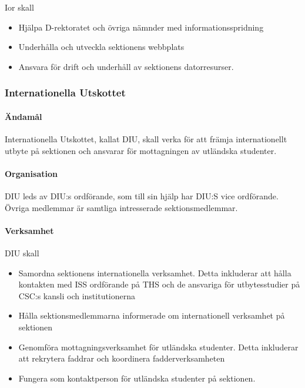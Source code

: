 \documentclass[a4paper,12pt]{article}
\begin{document}
Ior skall

\begin{itemize}
  \item Hjälpa D-rektoratet och övriga nämnder med informationsspridning
  \item Underhålla och utveckla sektionens webbplats
  \item Ansvara för drift och underhåll av sektionens datorresurser.
\end{itemize}

\subsubsection{Internationella Utskottet}

\paragraph{Ändamål}

Internationella Utskottet, kallat DIU, skall verka för att främja internationellt utbyte på sektionen och ansvarar för mottagningen av utländska studenter.

\paragraph{Organisation}

DIU leds av DIU:s ordförande, som till sin hjälp har DIU:S vice ordförande. Övriga medlemmar är samtliga intresserade sektionsmedlemmar.

\paragraph{Verksamhet}

DIU skall

\begin{itemize}
  \item Samordna sektionens internationella verksamhet. Detta inkluderar att hålla kontakten med ISS ordförande på THS och de ansvariga för utbytesstudier på CSC:s kansli och institutionerna
  \item Hålla sektionsmedlemmarna informerade om internationell verksamhet på sektionen
  \item Genomföra mottagningsverksamhet för utländska studenter. Detta inkluderar att rekrytera faddrar och koordinera fadderverksamheten
  \item Fungera som kontaktperson för utländska studenter på sektionen.
\end{itemize}
\end{document}
